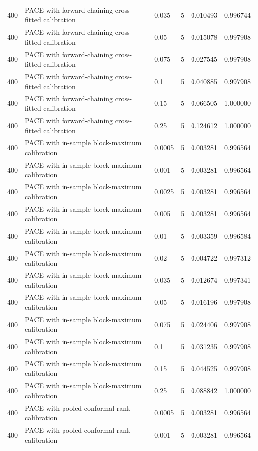 \begin{tabular}{llllll}
400 & PACE with forward-chaining cross-fitted calibration & 0.035 & 5 & 0.010493 & 0.996744 \\
400 & PACE with forward-chaining cross-fitted calibration & 0.05 & 5 & 0.015078 & 0.997908 \\
400 & PACE with forward-chaining cross-fitted calibration & 0.075 & 5 & 0.027545 & 0.997908 \\
400 & PACE with forward-chaining cross-fitted calibration & 0.1 & 5 & 0.040885 & 0.997908 \\
400 & PACE with forward-chaining cross-fitted calibration & 0.15 & 5 & 0.066505 & 1.000000 \\
400 & PACE with forward-chaining cross-fitted calibration & 0.25 & 5 & 0.124612 & 1.000000 \\
400 & PACE with in-sample block-maximum calibration & 0.0005 & 5 & 0.003281 & 0.996564 \\
400 & PACE with in-sample block-maximum calibration & 0.001 & 5 & 0.003281 & 0.996564 \\
400 & PACE with in-sample block-maximum calibration & 0.0025 & 5 & 0.003281 & 0.996564 \\
400 & PACE with in-sample block-maximum calibration & 0.005 & 5 & 0.003281 & 0.996564 \\
400 & PACE with in-sample block-maximum calibration & 0.01 & 5 & 0.003359 & 0.996584 \\
400 & PACE with in-sample block-maximum calibration & 0.02 & 5 & 0.004722 & 0.997312 \\
400 & PACE with in-sample block-maximum calibration & 0.035 & 5 & 0.012674 & 0.997341 \\
400 & PACE with in-sample block-maximum calibration & 0.05 & 5 & 0.016196 & 0.997908 \\
400 & PACE with in-sample block-maximum calibration & 0.075 & 5 & 0.024406 & 0.997908 \\
400 & PACE with in-sample block-maximum calibration & 0.1 & 5 & 0.031235 & 0.997908 \\
400 & PACE with in-sample block-maximum calibration & 0.15 & 5 & 0.044525 & 0.997908 \\
400 & PACE with in-sample block-maximum calibration & 0.25 & 5 & 0.088842 & 1.000000 \\
400 & PACE with pooled conformal-rank calibration & 0.0005 & 5 & 0.003281 & 0.996564 \\
400 & PACE with pooled conformal-rank calibration & 0.001 & 5 & 0.003281 & 0.996564 \\

\end{tabular}
